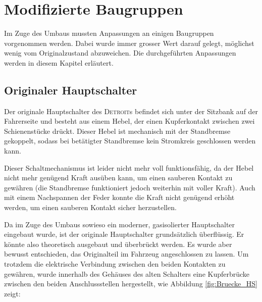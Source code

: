 \section{Modifizierte Baugruppen}

\color{blue}
Im Zuge des Umbaus mussten Anpassungen an einigen Baugruppen vorgenommen werden. Dabei wurde immer grosser Wert darauf gelegt, möglichst wenig vom Originalzustand abzuweichen. Die durchgeführten Anpassungen werden in diesem Kapitel erläutert.

\subsection{Originaler Hauptschalter} \label{orig_HS}
Der originale Hauptschalter des \textsc{Detroit}s befindet sich unter der Sitzbank auf der Fahrerseite und besteht aus einem Hebel, der einen Kupferkontakt zwischen zwei Schienenstücke drückt. Dieser Hebel ist mechanisch mit der Standbremse gekoppelt, sodass bei betätigter Standbremse kein Stromkreis geschlossen werden kann.

Dieser Schaltmechanismus ist leider nicht mehr voll funktionsfähig, da der Hebel nicht mehr genügend Kraft ausüben kann, um einen sauberen Kontakt zu gewähren (die Standbremse funktioniert jedoch weiterhin mit voller Kraft). Auch mit einem Nachspannen der Feder konnte die Kraft nicht genügend erhöht werden, um einen sauberen Kontakt sicher herzustellen.

Da im Zuge des Umbaus sowieso ein moderner, gasisolierter Hauptschalter eingebaut wurde, ist der originale Hauptschalter grundsätzlich überflüssig. Er könnte also theoretisch ausgebaut und überbrückt werden. Es wurde aber bewusst entschieden, das Originalteil im Fahrzeug angeschlossen zu lassen. Um trotzdem die elektrische Verbindung zwischen den beiden Kontakten zu gewähren, wurde innerhalb des Gehäuses des alten Schalters eine Kupferbrücke zwischen den beiden Anschlussstellen hergestellt, wie Abbildung \ref{fig:Bruecke_HS} zeigt:


